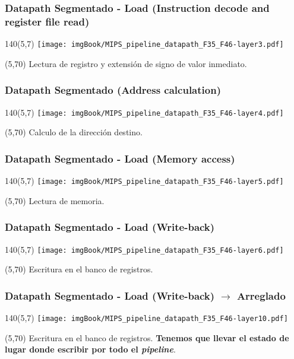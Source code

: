 \documentclass[aspectratio=169]{beamer}
\begin{document}
\begin{frame}[t,fragile]
    \frametitle{Datapath Segmentado - Load \large (Instruction decode and register file read)}
    \begin{textblock}{140}(5,7) \texttt{[image: imgBook/MIPS\_pipeline\_datapath\_F35\_F46-layer3.pdf]} \end{textblock}
    \begin{textblock}{30}(5,70) \footnotesize
    Lectura de registro y extensión de signo de valor inmediato.
    \end{textblock}
\end{frame}

\begin{frame}[t,fragile]
    \frametitle{Datapath Segmentado \large (Address calculation)}
    \begin{textblock}{140}(5,7) \texttt{[image: imgBook/MIPS\_pipeline\_datapath\_F35\_F46-layer4.pdf]} \end{textblock}
    \begin{textblock}{30}(5,70) \footnotesize
    Calculo de la dirección destino.
    \end{textblock}
\end{frame}

\begin{frame}[t,fragile]
    \frametitle{Datapath Segmentado - Load \large (Memory access)}
    \begin{textblock}{140}(5,7) \texttt{[image: imgBook/MIPS\_pipeline\_datapath\_F35\_F46-layer5.pdf]} \end{textblock}
    \begin{textblock}{30}(5,70) \footnotesize
    Lectura de memoria.
    \end{textblock}
\end{frame}

\begin{frame}[t,fragile]
    \frametitle{Datapath Segmentado - Load \large (Write-back)}
    \begin{textblock}{140}(5,7) \texttt{[image: imgBook/MIPS\_pipeline\_datapath\_F35\_F46-layer6.pdf]} \end{textblock}
    \begin{textblock}{30}(5,70) \footnotesize
    Escritura en el banco de registros. 
    \end{textblock}
\end{frame}

\begin{frame}[t,fragile]
    \frametitle{Datapath Segmentado - Load \large (Write-back) $\rightarrow$ \textbf{Arreglado}}
    \begin{textblock}{140}(5,7) \texttt{[image: imgBook/MIPS\_pipeline\_datapath\_F35\_F46-layer10.pdf]} \end{textblock}
    \begin{textblock}{38}(5,70) \footnotesize
    Escritura en el banco de registros.
    \textcolor{verdeuca}{\textbf{Tenemos que llevar el estado de lugar donde escribir por todo el \emph{pipeline}}}.
    \end{textblock}
\end{frame}
\end{document}
